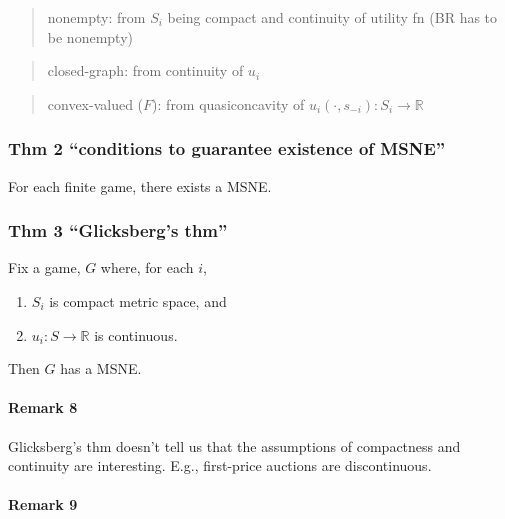 \documentclass[
]{article}
\providecommand{\tightlist}{%
  \setlength{\itemsep}{0pt}\setlength{\parskip}{0pt}}
\begin{document}
\begin{quote}
nonempty: from \(S_i\) being compact and continuity of utility fn (BR
has to be nonempty)
\end{quote}

\begin{quote}
closed-graph: from continuity of \(u_i\)
\end{quote}

\begin{quote}
convex-valued (\(F\)): from quasiconcavity of
\(u_i(\cdot, s_{-i}): S_i \rightarrow \mathbb{R}\)
\end{quote}

\hypertarget{thm-2-conditions-to-guarantee-existence-of-msne}{%
\subsubsection{Thm 2 ``conditions to guarantee existence of
MSNE''}\label{thm-2-conditions-to-guarantee-existence-of-msne}}

For each finite game, there exists a MSNE.

\hypertarget{thm-3-glicksbergs-thm}{%
\subsubsection{Thm 3 ``Glicksberg's thm''}\label{thm-3-glicksbergs-thm}}

Fix a game, \(G\) where, for each \(i\),

\begin{enumerate}
\def\labelenumi{\arabic{enumi}.}
\tightlist
\item
  \(S_i\) is compact metric space, and
\item
  \(u_i: S \rightarrow \mathbb{R}\) is continuous.
\end{enumerate}

Then \(G\) has a MSNE.

\hypertarget{remark-8}{%
\paragraph{Remark 8}\label{remark-8}}

Glicksberg's thm doesn't tell us that the assumptions of compactness and
continuity are interesting. E.g., first-price auctions are
discontinuous.

\hypertarget{remark-9}{%
\paragraph{Remark 9}\label{remark-9}}
\end{document}
